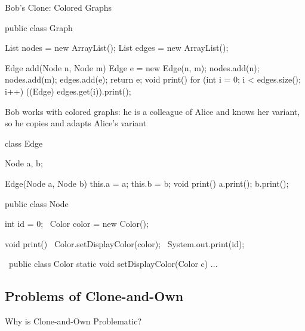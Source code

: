 \begin{frame}[fragile]{Bob's Clone: Colored Graphs}
	\begin{mycolumns}[b,columns=3,widths={43,26},animation=none]
\begin{codetight}{}
public class Graph {
	List nodes = new ArrayList();
	List edges = new ArrayList();

	Edge add(Node n, Node m) {
		Edge e = new Edge(n, m);
		nodes.add(n); nodes.add(m); edges.add(e);
		return e;
	}
	void print() {
		for (int i = 0; i < edges.size(); i++) {
			((Edge) edges.get(i)).print();
		}
	}
}
\end{codetight}
	\mynextcolumn
		\begin{example}{}
			Bob works with colored graphs: he is a colleague of Alice and knows her variant, so he copies and adapts Alice's variant
		\end{example}
\begin{codetight}{}
class Edge {
	Node a, b;

	Edge(Node a, Node b) {
		this.a = a; this.b = b;
	}
	void print() {
		a.print(); b.print();
	}
}
\end{codetight}
	\mynextcolumn
\begin{codetight}{}
public class Node {
	int id = 0;
	~Color color = new Color();~

	void print() {
		~Color.setDisplayColor(color);~
		System.out.print(id);
	}
}
\end{codetight}
\begin{codetight}{}
~public class Color {
	static void setDisplayColor(Color c) {...}
}~
\end{codetight}
	\end{mycolumns}
\end{frame}

\subsection{Problems of Clone-and-Own}

\begin{frame}{Why is Clone-and-Own Problematic?}
	~\hfill
	\hfill
	\hfill
	\hfill~
\end{frame}

